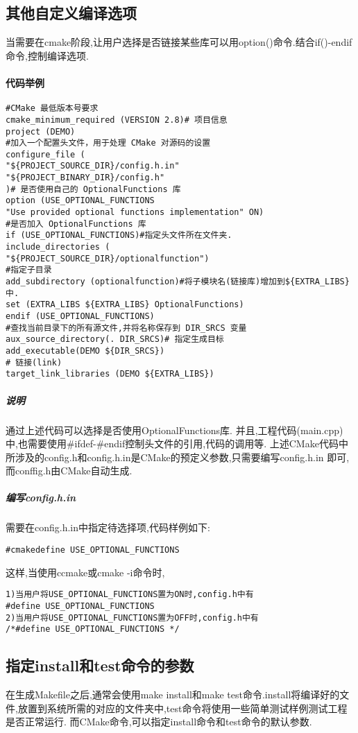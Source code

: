 \documentclass{ctexart}
\begin{document}
\subsection{其他自定义编译选项}
当需要在cmake阶段,让用户选择是否链接某些库可以用option()命令.结合if()-endif命令,控制编译选项.
\paragraph{代码举例}
\begin{verbatim}
#CMake 最低版本号要求
cmake_minimum_required (VERSION 2.8)# 项目信息
project (DEMO)
#加入一个配置头文件，用于处理 CMake 对源码的设置
configure_file (
"${PROJECT_SOURCE_DIR}/config.h.in"
"${PROJECT_BINARY_DIR}/config.h"
)# 是否使用自己的 OptionalFunctions 库
option (USE_OPTIONAL_FUNCTIONS
"Use provided optional functions implementation" ON)
#是否加入 OptionalFunctions 库
if (USE_OPTIONAL_FUNCTIONS)#指定头文件所在文件夹.
include_directories (
"${PROJECT_SOURCE_DIR}/optionalfunction")
#指定子目录
add_subdirectory (optionalfunction)#将子模块名(链接库)增加到${EXTRA_LIBS}中.
set (EXTRA_LIBS ${EXTRA_LIBS} OptionalFunctions)
endif (USE_OPTIONAL_FUNCTIONS)
#查找当前目录下的所有源文件,并将名称保存到 DIR_SRCS 变量
aux_source_directory(. DIR_SRCS)# 指定生成目标
add_executable(DEMO ${DIR_SRCS})
# 链接(link)
target_link_libraries (DEMO ${EXTRA_LIBS})
\end{verbatim}
\subparagraph{说明}
通过上述代码可以选择是否使用OptionalFunctions库.
并且,工程代码(main.cpp)中,也需要使用\#ifdef-\#endif控制头文件的引用,代码的调用等.
上述CMake代码中所涉及的config.h和config.h.in是CMake的预定义参数,只需要编写config.h.in 即可,而conffig.h由CMake自动生成.
\subparagraph{编写config.h.in}
需要在config.h.in中指定待选择项,代码样例如下:
\begin{verbatim}
#cmakedefine USE_OPTIONAL_FUNCTIONS
\end{verbatim}
这样,当使用ccmake或cmake -i命令时,
\begin{verbatim}
1)当用户将USE_OPTIONAL_FUNCTIONS置为ON时,config.h中有
#define USE_OPTIONAL_FUNCTIONS
2)当用户将USE_OPTIONAL_FUNCTIONS置为OFF时,config.h中有
/*#define USE_OPTIONAL_FUNCTIONS */
\end{verbatim}
\subsection{指定install和test命令的参数}
在生成Makefile之后,通常会使用make install和make test命令.install将编译好的文件,放置到系统所需的对应的文件夹中,test命令将使用一些简单测试样例测试工程是否正常运行.
而CMake命令,可以指定install命令和test命令的默认参数.
\end{document}
